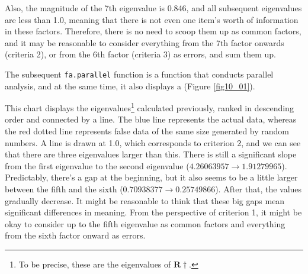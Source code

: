 \documentclass{ltjsbook}
\begin{document}
Also, the magnitude of the 7th eigenvalue is 0.846, and all subsequent eigenvalues are less than 1.0, meaning that there is not even one item's worth of information in these factors. Therefore, there is no need to scoop them up as common factors, and it may be reasonable to consider everything from the 7th factor onwards (criteria 2), or from the 6th factor (criteria 3) as errors, and sum them up.

The subsequent \texttt{fa.parallel} function is a function that conducts parallel analysis, and at the same time, it also displays a  (Figure \ref{fig10_01}).


This chart displays the eigenvalues\footnote{To be precise, these are the eigenvalues of $\bm{R}\dagger$.} calculated previously, ranked in descending order and connected by a line. The blue line represents the actual data, whereas the red dotted line represents false data of the same size generated by random numbers. A line is drawn at 1.0, which corresponds to criterion 2, and we can see that there are three eigenvalues larger than this. There is still a significant slope from the first eigenvalue to the second eigenvalue ($4.26063957\to  1.91279965$). Predictably, there's a gap at the beginning, but it also seems to be a little larger between the fifth and the sixth ($0.70938377  \to0.25749866$). After that, the values gradually decrease. It might be reasonable to think that these big gaps mean significant differences in meaning. From the perspective of criterion 1, it might be okay to consider up to the fifth eigenvalue as common factors and everything from the sixth factor onward as errors.
\end{document}
